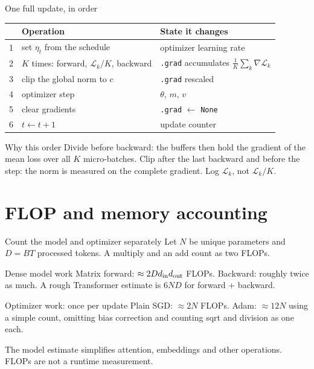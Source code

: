 \documentclass[handout]{beamer}
\begin{document}
\begin{frame}{One full update, in order}
  \small
  \begin{center}
    \begin{tabular}{@{}cll@{}}
      \toprule
      & Operation & State it changes \\
      \midrule
      1 & set $\eta_t$ from the schedule & optimizer learning rate \\
      2 & $K$ times: forward, $\mathcal L_k/K$, backward & \texttt{.grad} accumulates $\tfrac1K\sum_k\nabla\mathcal L_k$ \\
      3 & clip the global norm to $c$ & \texttt{.grad} rescaled \\
      4 & optimizer step & $\theta$, $m$, $v$ \\
      5 & clear gradients & \texttt{.grad} $\leftarrow$ \texttt{None} \\
      6 & $t\leftarrow t+1$ & update counter \\
      \bottomrule
    \end{tabular}
  \end{center}
  \begin{alertblock}{Why this order}
    Divide before backward: the buffers then hold the gradient of the mean loss over all $K$ micro-batches. Clip after the last backward and before the step: the norm is measured on the complete gradient. Log $\mathcal L_k$, not $\mathcal L_k/K$.
  \end{alertblock}
\end{frame}

\section{FLOP and memory accounting}

\begin{frame}{Count the model and optimizer separately}
  \small
  Let $N$ be unique parameters and $D=BT$ processed tokens. A multiply and an add count as two FLOPs.
  \begin{block}{Dense model work}
    Matrix forward: $\approx 2D d_{\rm in}d_{\rm out}$ FLOPs. Backward: roughly twice as much. A rough Transformer estimate is $6ND$ for forward + backward.
  \end{block}
  \begin{block}{Optimizer work: once per update}
    Plain SGD: $\approx 2N$ FLOPs. Adam: $\approx 12N$ using a simple count, omitting bias correction and counting sqrt and division as one each.
  \end{block}
  \footnotesize The model estimate simplifies attention, embeddings and other operations. FLOPs are not a runtime measurement.
\end{frame}
\end{document}
